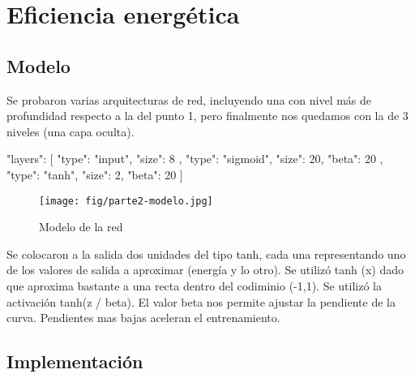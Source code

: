 \newpage
\section{Eficiencia energética}




\subsection{Modelo}

Se probaron varias arquitecturas de red, incluyendo una con nivel más de profundidad respecto a la del punto 1, pero finalmente nos quedamos con la de 3 niveles (una capa oculta).

{
"layers": [{
"type": "input",
"size": 8
}, {
"type": "sigmoid",
"size": 20,
"beta": 20
}, {
"type": "tanh",
"size": 2,
"beta": 20
}]
}


\begin{figure}[ht!]
	\centering
	\texttt{[image: fig/parte2-modelo.jpg]}
	\caption{Modelo de la red}
\end{figure}

Se colocaron a la salida dos unidades del tipo tanh, cada una representando uno de los valores de salida a aproximar (energía y lo otro). Se utilizó tanh (x) 
dado que aproxima bastante a una recta dentro del codiminio (-1,1). Se utilizó la activación tanh(z / beta).  El valor beta nos permite ajustar la pendiente de la curva. 
Pendientes mas bajas aceleran el entrenamiento.




\subsection{Implementación}

